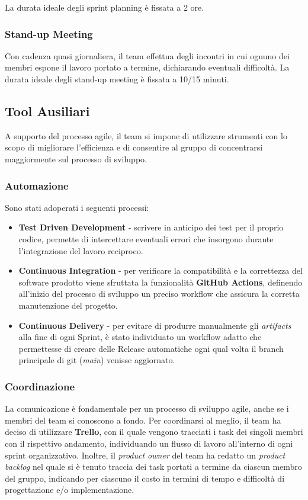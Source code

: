 La durata ideale degli sprint planning è fissata a 2 ore.

\subsubsection{Stand-up Meeting}
Con cadenza quasi giornaliera, il team effettua degli incontri in cui ognuno dei membri espone il lavoro portato a termine, dichiarando eventuali difficoltà.
La durata ideale degli stand-up meeting è fissata a 10/15 minuti.

\subsection{Tool Ausiliari}
A supporto del processo agile, il team si impone di utilizzare strumenti con lo scopo di migliorare l’efficienza e di consentire al gruppo di concentrarsi maggiormente sul processo di sviluppo.

\subsubsection{Automazione}
Sono stati adoperati i seguenti processi:
\begin{itemize}
    \item \textbf{Test Driven Development} - scrivere in anticipo dei test per il proprio codice, permette di intercettare eventuali errori che insorgono durante l'integrazione del lavoro reciproco.
    \item \textbf{Continuous Integration} - per verificare la compatibilità e la correttezza del software prodotto viene sfruttata la funzionalità \textbf{GitHub Actions}, definendo all'inizio del processo di sviluppo un preciso workflow che assicura la corretta manutenzione del progetto.
    \item \textbf{Continuous Delivery} - per evitare di produrre manualmente gli \textit{artifacts} alla fine di ogni Sprint, è stato individuato un workflow adatto che permettesse di creare delle Release automatiche ogni qual volta il branch principale di git (\textit{main}) venisse aggiornato.
\end{itemize}

\subsubsection{Coordinazione}
La comunicazione è fondamentale per un processo di sviluppo agile, anche se i membri del team si conoscono a fondo.
Per coordinarsi al meglio, il team ha deciso di utilizzare \textbf{Trello}, con il quale vengono tracciati i task dei singoli membri con il rispettivo andamento, individuando un flusso di lavoro all'interno di ogni sprint organizzativo. Inoltre, il \textit{product owner} del team ha redatto un \textit{product backlog} nel quale si è tenuto traccia dei task portati a termine da ciascun membro del gruppo, indicando per ciascuno il costo in termini di tempo e difficoltà di progettazione e/o implementazione.
